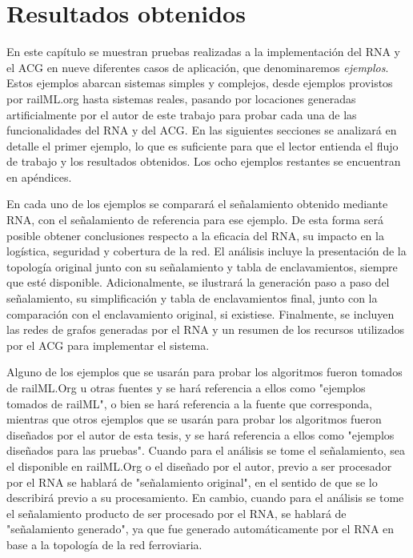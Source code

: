 \chapter{Resultados obtenidos}
	\label{sec:resultados}

	En este capítulo se muestran pruebas realizadas a la implementación del RNA y el ACG en nueve diferentes casos de aplicación, que denominaremos \textit{ejemplos}. Estos ejemplos abarcan sistemas simples y complejos, desde ejemplos provistos por railML.org hasta sistemas reales, pasando por locaciones generadas artificialmente por el autor de este trabajo para probar cada una de las funcionalidades del RNA y del ACG. En las siguientes secciones se analizará en detalle el primer ejemplo, lo que es suficiente para que el lector entienda el flujo de trabajo y los resultados obtenidos. Los ocho ejemplos restantes se encuentran en apéndices.
	
	En cada uno de los ejemplos se comparará el señalamiento obtenido mediante RNA, con el señalamiento de referencia para ese ejemplo. De esta forma será posible obtener conclusiones respecto a la eficacia del RNA, su impacto en la logística, seguridad y cobertura de la red. El análisis incluye la presentación de la topología original junto con su señalamiento y tabla de enclavamientos, siempre que esté disponible. Adicionalmente, se ilustrará la generación paso a paso del señalamiento, su simplificación y tabla de enclavamientos final, junto con la comparación con el enclavamiento original, si existiese. Finalmente, se incluyen las redes de grafos generadas por el RNA y un resumen de los recursos utilizados por el ACG para implementar el sistema.
	
	Alguno de los ejemplos que se usarán para probar los algoritmos fueron tomados de railML.Org u otras fuentes y se hará referencia a ellos como "ejemplos tomados de railML", o bien se hará referencia a la fuente que corresponda, mientras que otros ejemplos que se usarán para probar los algoritmos fueron diseñados por el autor de esta tesis, y se hará referencia a ellos como "ejemplos diseñados para las pruebas". Cuando para el análisis se tome el señalamiento, sea el disponible en railML.Org o el diseñado por el autor, previo a ser procesador por el RNA se hablará de "señalamiento original", en el sentido de que se lo describirá previo a su procesamiento. En cambio, cuando para el análisis se tome el señalamiento producto de ser procesado por el RNA, se hablará de "señalamiento generado", ya que fue generado automáticamente por el RNA en base a la topología de la red ferroviaria.	
	
	
	
	
